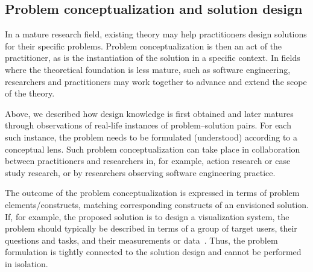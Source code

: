 \documentclass[graybox]{svmult}
\newcommand{\peggy}[1]{\textcolor{blue}{{\it [Peggy says: #1]}}}
\newcommand{\per}[1]{\textcolor{cyan}{{\it [Per says: #1]}}}
\newcommand{\peggy}[1]{}
\newcommand{\per}[1]{}
\begin{document}
\subsection{Problem conceptualization and solution design}


In a mature research field, existing theory may help practitioners design solutions for their specific problems. Problem conceptualization is then an act of the practitioner, as is the instantiation of the solution in a specific context. In fields where the theoretical foundation is less mature, such as software engineering, researchers and practitioners may work together to advance and extend the scope of the theory. 

 Above, we described how design knowledge is first obtained and later matures through observations of real-life instances of problem--solution pairs. For each such instance, the problem needs to be formulated (understood) according to a conceptual lens. Such problem conceptualization can take place in collaboration between practitioners and researchers in, for example, action research or case study research, or by researchers observing software engineering practice.


The outcome of the problem conceptualization is expressed in terms of problem elements/constructs, matching corresponding constructs of an envisioned solution. If, for example, the proposed solution is to design a visualization system, the problem should typically be described in terms of a group of target users, their questions and tasks, and their measurements or data~\cite{meyer_nested_2015}. Thus, the problem formulation is tightly connected to the solution design and cannot be performed in isolation. 
\end{document}
